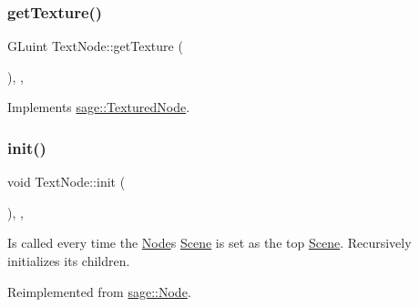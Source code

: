 \mbox{\label{classsage_1_1TextNode_ae21f17c6cb993692d8da89424b2581d7}} 
\subsubsection{\texorpdfstring{getTexture()}{getTexture()}}
{\footnotesize\ttfamily G\+Luint Text\+Node\+::get\+Texture (\begin{DoxyParamCaption}{ }\end{DoxyParamCaption})\hspace{0.3cm}{\ttfamily [override]}, {\ttfamily [protected]}, {\ttfamily [virtual]}}



Implements \mbox{\hyperlink{classsage_1_1TexturedNode_a079cea0b12a1d0e3ea69459546736c0f}{sage\+::\+Textured\+Node}}.

\mbox{\label{classsage_1_1TextNode_ae389b7b4afae4d068ac29686343f279e}} 
\subsubsection{\texorpdfstring{init()}{init()}}
{\footnotesize\ttfamily void Text\+Node\+::init (\begin{DoxyParamCaption}{ }\end{DoxyParamCaption})\hspace{0.3cm}{\ttfamily [override]}, {\ttfamily [protected]}, {\ttfamily [virtual]}}



Is called every time the \mbox{\hyperlink{classsage_1_1Node}{Node}}\textquotesingle{}s \mbox{\hyperlink{classsage_1_1Scene}{Scene}} is set as the top \mbox{\hyperlink{classsage_1_1Scene}{Scene}}. Recursively initializes its children. 



Reimplemented from \mbox{\hyperlink{classsage_1_1Node_ab87776adae83149e235e37ed469f4e10}{sage\+::\+Node}}.

\mbox{\label{classsage_1_1TextNode_a7984e4a663f48338da018b780704b95f}} 
